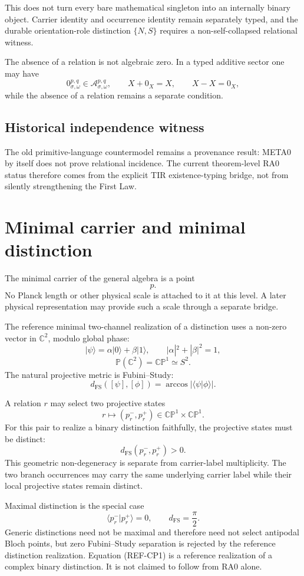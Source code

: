 \documentclass[11pt]{article}
\newcommand{\CP}{\mathbb{CP}^{1}}
\newcommand{\FS}{\mathrm{FS}}
\begin{document}
This does not turn every bare mathematical singleton into an internally binary
object. Carrier identity and occurrence identity remain separately typed, and
the durable orientation-role distinction \(\{N,S\}\) requires a
non-self-collapsed relational witness.

The absence of a relation is not algebraic zero. In a typed additive sector
one may have
\[
0_{\sigma,\omega}^{p,q}\in\mathcal A_{\sigma,\omega}^{p,q},
\qquad
X+0_X=X,
\qquad
X-X=0_X,
\]
while the absence of a relation remains a separate condition.

\subsection{Historical independence witness}

The old primitive-language countermodel remains a provenance result:
META0 by itself does not prove relational incidence. The current theorem-level
RA0 status therefore comes from the explicit TIR existence-typing bridge,
not from silently strengthening the First Law.

\section{Minimal carrier and minimal distinction}

The minimal carrier of the general algebra is a point
\[
\boxed{p.}
\]
No Planck length or other physical scale is attached to it at this level.
A later physical representation may provide such a scale through a separate
bridge.

The reference minimal two-channel realization of a distinction uses a
non-zero vector in \(\mathbb C^2\), modulo global phase:
\[
|\psi\rangle
=\alpha|0\rangle+\beta|1\rangle,
\qquad
|\alpha|^2+|\beta|^2=1,
\]
\[
\boxed{
\mathbb P(\mathbb C^2)=\CP\simeq S^2.
}
\tag{REF-CP1}
\]
The natural projective metric is Fubini--Study:
\[
\boxed{
d_{\FS}([\psi],[\phi])
=\arccos|\langle\psi|\phi\rangle|.
}
\]

A relation \(r\) may select two projective states
\[
r\longmapsto(p_r^-,p_r^+)\in\CP\times\CP.
\]
For this pair to realize a binary distinction faithfully, the projective
states must be distinct:
\[
\boxed{
d_{\FS}(p_r^-,p_r^+)>0.
}
\]
This geometric non-degeneracy is separate from carrier-label multiplicity.
The two branch occurrences may carry the same underlying carrier label while
their local projective states remain distinct.

Maximal distinction is the special case
\[
\langle p_r^-|p_r^+\rangle=0,
\qquad
d_{\FS}=\frac{\pi}{2}.
\]
Generic distinctions need not be maximal and therefore need not select
antipodal Bloch points, but zero Fubini--Study separation is rejected by the
reference distinction realization. Equation (REF-CP1) is a reference realization of a
complex binary distinction. It is not claimed to follow from RA0 alone.
\end{document}
